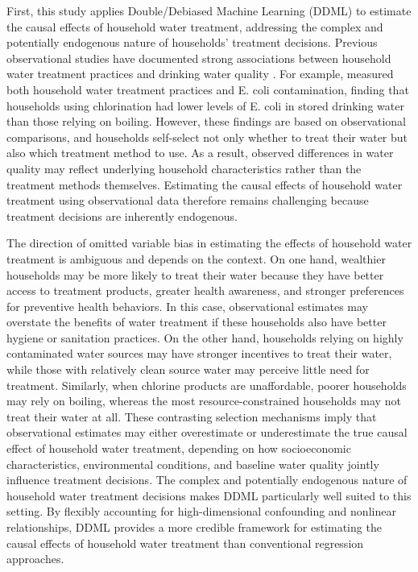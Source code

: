 \documentclass [11pt]{article}
\theoremstyle{plain}
\theoremstyle{definition}
\theoremstyle{remark}
\newcommand{\1}{\bm{1}}
\begin{document}
First, this study applies Double/Debiased Machine Learning (DDML) to estimate the causal effects of household water treatment, addressing the complex and potentially endogenous nature of households’ treatment decisions. Previous observational studies have documented strong associations between household water treatment practices and drinking water quality \citep{cohen2017effects}. For example, \cite{fagerli2017comparison} measured both household water treatment practices and E. coli contamination, finding that households using chlorination had lower levels of E. coli in stored drinking water than those relying on boiling. However, these findings are based on observational comparisons, and households self-select not only whether to treat their water but also which treatment method to use. As a result, observed differences in water quality may reflect underlying household characteristics rather than the treatment methods themselves. Estimating the causal effects of household water treatment using observational data therefore remains challenging because treatment decisions are inherently endogenous.

The direction of omitted variable bias in estimating the effects of household water treatment is ambiguous and depends on the context. On one hand, wealthier households may be more likely to treat their water because they have better access to treatment products, greater health awareness, and stronger preferences for preventive health behaviors. In this case, observational estimates may overstate the benefits of water treatment if these households also have better hygiene or sanitation practices. On the other hand, households relying on highly contaminated water sources may have stronger incentives to treat their water, while those with relatively clean source water may perceive little need for treatment. Similarly, when chlorine products are unaffordable, poorer households may rely on boiling, whereas the most resource-constrained households may not treat their water at all. These contrasting selection mechanisms imply that observational estimates may either overestimate or underestimate the true causal effect of household water treatment, depending on how socioeconomic characteristics, environmental conditions, and baseline water quality jointly influence treatment decisions. The complex and potentially endogenous nature of household water treatment decisions makes DDML particularly well suited to this setting. By flexibly accounting for high-dimensional confounding and nonlinear relationships, DDML provides a more credible framework for estimating the causal effects of household water treatment than conventional regression approaches.
\end{document}
